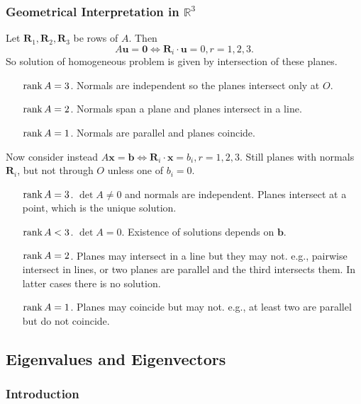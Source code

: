 \documentclass[a4paper]{article}
\begin{document}
    \subsubsection{Geometrical Interpretation in $ \mathbb{R}^{3} $}
    Let $ \mathbf{R}_1,\mathbf{R}_2,\mathbf{R}_3 $ be rows of $A$. Then
    \[
      A\mathbf{u}=\mathbf{0}\Longleftrightarrow \mathbf{R}_i\cdot
      \mathbf{u}=0, r=1,2,3
    .\]
    So solution of homogeneous problem is given by intersection of these planes.
    \begin{enumerate}[align=left]
      \item[\underline{$ \rank A=3 $}.] Normals are independent so
        the planes intersect only at $O$.
      \item[\underline{$ \rank A=2 $}.] Normals span a plane and
        planes intersect in a line.
      \item[\underline{$ \rank A=1 $}.] Normals are parallel and
        planes coincide.
    \end{enumerate}

    Now consider instead $ A\mathbf{x}=\mathbf{b}\Leftrightarrow
    \mathbf{R}_i\cdot \mathbf{x}=b_i, r=1,2,3 $. Still planes with
    normals $ \mathbf{R}_i $, but not through $O$ unless one of $b_i=0$.
    \begin{enumerate}[align=left]
      \item[\underline{$ \rank A=3 $}.] $ \det A\neq 0 $ and normals
        are independent. Planes intersect at a point, which is the
        unique solution.
      \item[\underline{$ \rank A<3 $}.] $ \det A=0 $. Existence of
        solutions depends on $\mathbf{b}$.
      \item[\underline{$ \rank A=2 $}.] Planes may intersect in a
        line but they may not. e.g., pairwise intersect in lines, or
        two planes are parallel and the third intersects them. In
        latter cases there is no solution.
      \item[\underline{$ \rank A=1 $}.] Planes may coincide but may
        not. e.g., at least two are parallel but do not coincide.
    \end{enumerate}
    \subsection{Eigenvalues and Eigenvectors}
    \subsubsection{Introduction}
\end{document}
